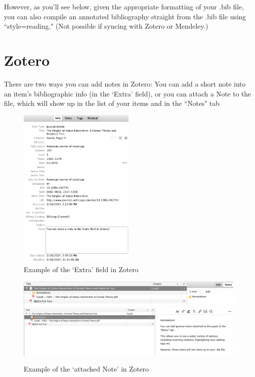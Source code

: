\documentclass{article}
\begin{document}
However, as you'll see below, given the appropriate formatting of your .bib file, you can also compile an annotated bibliography straight from the .bib file using ``style=reading." (Not possible if syncing with Zotero or Mendeley.)

\FloatBarrier
\section*{Zotero}

There are two ways you can add notes in Zotero: You can add a short note into an item's bibliographic info (in the `Extra' field), or you can attach a Note to the file, which will show up in the list of your items and in the ``Notes" tab\\

\begin{figure}[!ht]
\centering
\includegraphics[width=0.5\textwidth]{screenshots/Zotero1a.png}
\caption{Example of the `Extra' field in Zotero}
\end{figure}

\begin{figure}[!ht]
\centering
\includegraphics[width=\textwidth]{screenshots/Zotero1b.png}
\includegraphics[width=\textwidth]{screenshots/Zotero1c.png}
\caption{Example of the `attached Note' in Zotero}
\end{figure}
\end{document}
